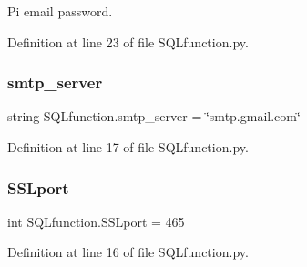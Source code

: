 Pi email password. 



Definition at line 23 of file S\+Q\+Lfunction.\+py.

\mbox{\label{namespace_s_q_lfunction_afc238002d1e4aeb7f8d2e10d47dfad36}} 
\subsubsection{\texorpdfstring{smtp\+\_\+server}{smtp\_server}}
{\footnotesize\ttfamily string S\+Q\+Lfunction.\+smtp\+\_\+server = \char`\"{}smtp.\+gmail.\+com\char`\"{}}



Definition at line 17 of file S\+Q\+Lfunction.\+py.

\mbox{\label{namespace_s_q_lfunction_a700c01c62cb7f1ed2561f5e640da46cf}} 
\subsubsection{\texorpdfstring{S\+S\+Lport}{SSLport}}
{\footnotesize\ttfamily int S\+Q\+Lfunction.\+S\+S\+Lport = 465}



Definition at line 16 of file S\+Q\+Lfunction.\+py.

